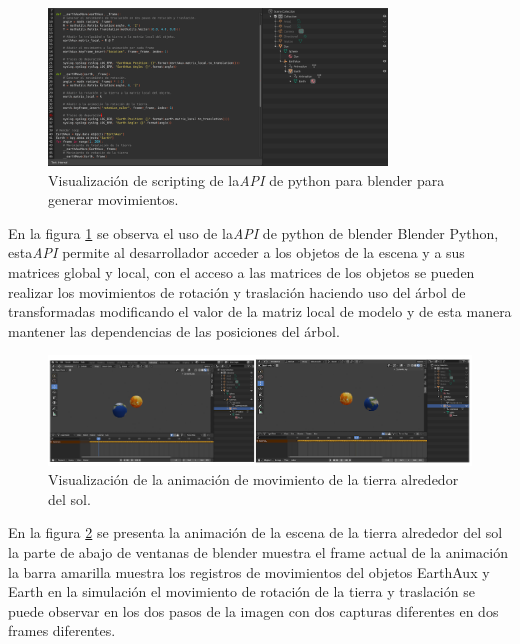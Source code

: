 \documentclass[a4paper]{book}
\begin{document}
\begin{figure}[H]
    \centering
    \includegraphics[width=9cm, keepaspectratio]{img/Scripting.png}
    \caption{Visualización de scripting de la\textit{API} de python para blender para generar movimientos.}
    \label{Scripting}
\end{figure}

En la figura \ref{Scripting} se observa el uso de la\textit{API} de python de blender Blender Python, esta\textit{API} permite al desarrollador acceder a los objetos de la
escena y a sus matrices global y local, con el acceso a las matrices de los objetos se pueden realizar los movimientos de rotación y
traslación haciendo uso del árbol de transformadas modificando el valor de la matriz local de modelo y de esta manera mantener las
dependencias de las posiciones del árbol.

\begin{figure}[H]
    \centering
    \includegraphics[width=15cm, keepaspectratio]{img/AnimationBlender.png}
    \caption{Visualización de la animación de movimiento de la tierra alrededor del sol.}
    \label{AnimationBlender}
\end{figure}

En la figura \ref{AnimationBlender} se presenta la animación de la escena de la tierra alrededor del sol la parte de abajo de ventanas de blender
muestra el frame actual de la animación la barra amarilla muestra los registros de movimientos del objetos EarthAux y Earth en
la simulación el movimiento de rotación de la tierra y traslación se puede observar en los dos pasos de la imagen con dos
capturas diferentes en dos frames diferentes.
\end{document}
